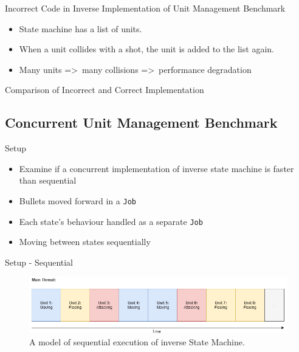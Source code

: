 \begin{frame}{\secname}{\subsecname}
	Incorrect Code in Inverse Implementation of Unit Management Benchmark
	\begin{itemize}
		\item State machine has a list of units.
		\item When a unit collides with a shot, the unit is added to the list again.
		\item Many units =\textgreater\ many collisions =\textgreater\ performance degradation
	\end{itemize}
\end{frame}

\begin{frame}[fragile]{\secname}{\subsecname}
	Comparison of Incorrect and Correct Implementation
\end{frame}

\subsection{Concurrent Unit Management Benchmark}

\begin{frame}{\secname}{\subsecname}
	Setup
	\begin{itemize}
		\item Examine if a concurrent implementation of inverse state machine is faster than sequential
		\item Bullets moved forward in a \texttt{Job}
		\item Each state's behaviour handled as a separate \texttt{Job}
		\item Moving between states sequentially
	\end{itemize}
\end{frame}

\begin{frame}{\secname}{\subsecname}
	Setup - Sequential
	\begin{figure}[h!]
        \centering
        \includegraphics[width=.7\textwidth]{pictures/sequential.png}
        \caption{A model of sequential execution of inverse State Machine.}
    \end{figure}
\end{frame}

